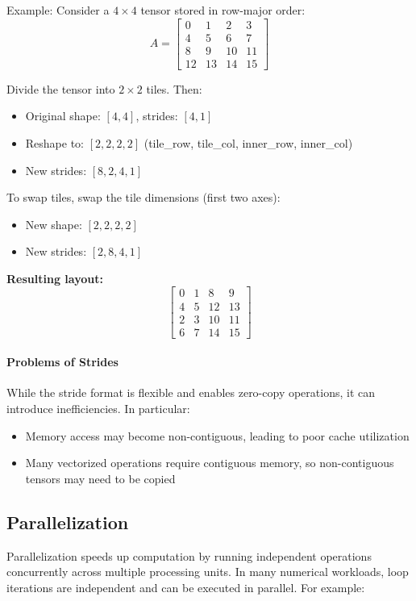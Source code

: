 \documentclass[twoside]{article}
\begin{document}
Example:
Consider a $4 \times 4$ tensor stored in row-major order:
\[
A =
\begin{bmatrix}
0 & 1 & 2 & 3 \\
4 & 5 & 6 & 7 \\
8 & 9 & 10 & 11 \\
12 & 13 & 14 & 15
\end{bmatrix}
\]

Divide the tensor into $2 \times 2$ tiles. Then:
\begin{itemize}
    \item Original shape: $[4, 4]$, strides: $[4, 1]$
    \item Reshape to: $[2, 2, 2, 2]$ (tile\_row, tile\_col, inner\_row, inner\_col)
    \item New strides: $[8, 2, 4, 1]$
\end{itemize}

To swap tiles, swap the tile dimensions (first two axes):
\begin{itemize}
    \item New shape: $[2, 2, 2, 2]$
    \item New strides: $[2, 8, 4, 1]$
\end{itemize}

\textbf{Resulting layout:}
\[
\begin{bmatrix}
0 & 1 & 8 & 9 \\
4 & 5 & 12 & 13 \\
2 & 3 & 10 & 11 \\
6 & 7 & 14 & 15
\end{bmatrix}
\]

\paragraph{Problems of Strides}
While the stride format is flexible and enables zero-copy operations, it can introduce inefficiencies. In particular:
\begin{itemize}
    \item Memory access may become non-contiguous, leading to poor cache utilization
    \item Many vectorized operations require contiguous memory, so non-contiguous tensors may need to be copied
\end{itemize}


\subsection{Parallelization}
Parallelization speeds up computation by running independent operations concurrently across multiple processing units. In many numerical workloads, loop iterations are independent and can be executed in parallel. For example:
\end{document}
